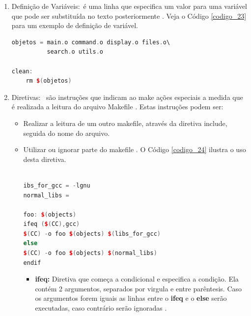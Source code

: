 \begin{enumerate}
\begin{lstlisting}[language=C++,caption={ 
                                     Utilização de padrões no makefile},
                                                        label=codigo_22]
    \end{lstlisting}


    \item Definição de Variáveis:\
 é uma linha que especifica um valor para uma variável que pode ser substituída no
 texto posteriormente \cite[pag.111]{ref43}. Veja o Código \ref{codigo_23} para um exemplo de 
definição de variável.

    \begin{lstlisting}[language=C++,caption={ 
                                     Definição e utilização de variável},
                                                         label=codigo_23]
objetos = main.o command.o display.o files.o\
          search.o utils.o

clean:
    rm $(objetos)
    \end{lstlisting}


    \item Diretivas: \
são instruções que indicam ao make ações especiais a medida que é realizada a leitura do
 arquivo Makefile \cite[pag.22]{ref45}. Estas instruções podem ser:

    \begin{itemize}
        \item Realizar a leitura de um outro makefile, através da diretiva include, seguida do nome do arquivo.
        \item Utilizar ou ignorar parte do makefile \cite[pag.22]{ref43}. O Código \ref{codigo_24} ilustra o uso desta diretiva. 


    \begin{lstlisting}[language=C++,caption={ 
                                      Makefile com diretiva condicional},
                                                         label=codigo_24]

ibs_for_gcc = -lgnu
normal_libs =

foo: $(objects)
ifeq ($(CC),gcc)
$(CC) -o foo $(objects) $(libs_for_gcc)
else
$(CC) -o foo $(objects) $(normal_libs)
endif

    \end{lstlisting}

    \begin{itemize}
        \item \textbf{ifeq:} Diretiva que começa a condicional e especifica a 
    condição. Ela contém 2 argumentos, separados por virgula e entre parêntesis.
     Caso os argumentos forem iguais as linhas entre o \textbf{ifeq} e o
     \textbf{else} serão executadas, caso contrário serão ignoradas \cite[pag.77]{ref45}.


\end{itemize}
\end{itemize}
\end{enumerate}

